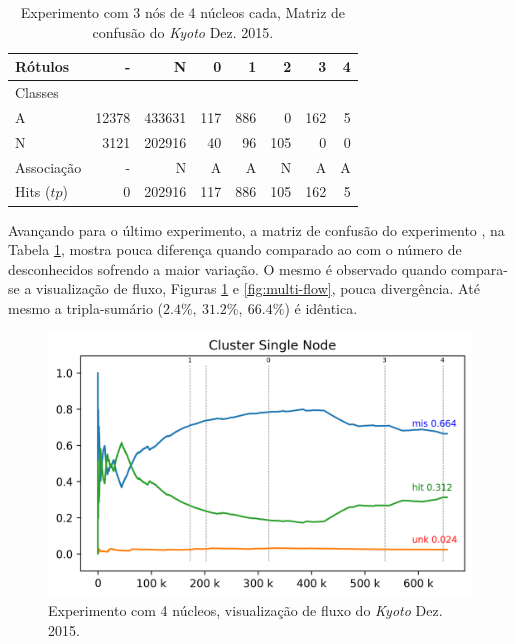 \begin{table}[hbt]
  \centering
  \caption{Experimento \mfog \multi com 3 nós de 4 núcleos cada, Matriz de confusão do \dataset \emph{Kyoto} Dez. 2015.}
  \label{tab:multi-matrix}
  \begin{tabular}{l|r|r|r|r|r|r|r}
    Rótulos   &      - &       N &    0 &    1 &    2 &    3 &  4 \\\hline
    Classes   &        &         &      &      &      &      &    \\\hline
    \hline
    A      &  12378 &  433631 &  117 &  886 &    0 &  162 &  5 \\\hline
    N      &   3121 &  202916 &   40 &   96 &  105 &    0 &  0 \\\hline
    \hline
    Associação   &      - &       N &    A &    A &    N &    A &  A \\\hline
    Hits ($tp$)   &      0 &  202916 &  117 &  886 &  105 &  162 &  5 
  \end{tabular}
\end{table}

Avançando para o último experimento, a matriz de confusão do experimento \multi, 
na Tabela \ref{tab:multi-matrix}, mostra pouca diferença quando comparado ao \single
com o número de desconhecidos sofrendo a maior variação.
O mesmo é observado quando compara-se a visualização de fluxo, Figuras
\ref{fig:single-flow} e \ref{fig:multi-flow}, pouca divergência.
Até mesmo a tripla-sumário ($2.4\%,\: 31.2\%,\: 66.4\%$) é idêntica.

\begin{figure}[htb]
  \centering
  \includegraphics[width=0.75\linewidth]{experiments/tmi-base-log.png}
  \caption{Experimento \mfog \single com 4 núcleos, visualização de fluxo do \dataset \emph{Kyoto} Dez. 2015.}
  \label{fig:single-flow}
\end{figure}

